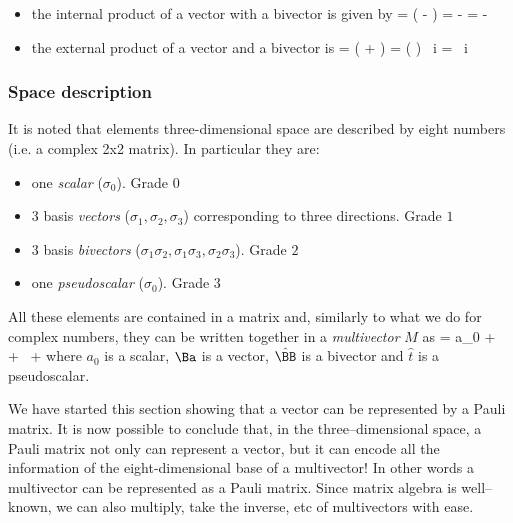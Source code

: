 \begin{itemize}
\Ba \, \hat{\BB} = \Ba \cdot \hat{\BB} + \Ba \wedge \hat{\BB}
\ee
\item the internal product of a vector with a bivector is given by
\be 
\Ba \cdot \hat{\BB}  =  \left(\Ba \hat{\BB} - \hat{\BB} \Ba \right) = - \Ba \times \Bb \times \Bc = - \Ba \times \BB
\ee
\item the external product of a vector and a bivector is
%
\be 
\Ba \wedge \hat{\BB}  =  \left(\Ba \hat{\BB} + \hat{\BB} \Ba \right) =  \Ba \cdot \left( \Bb \times \Bc\right) \,  i  =  \Ba \cdot  \BB  \,  i 
\ee
%
%
\end{itemize}


\subsubsection{Space description}
It is noted that elements  three-dimensional space are described by eight numbers (i.e. a complex 2x2 matrix). In particular they are: 
\begin{itemize}
\item one \emph{scalar} ($\sigma_0$). Grade $0$
\item 3 basis \emph{vectors} ($\sigma_1, \sigma_2, \sigma_3$) corresponding to three directions. Grade $1$
\item 3 basis \emph{bivectors} ($\sigma_1 \sigma_2, \sigma_1 \sigma_3, \sigma_2 \sigma_3$). Grade $2$
\item one \emph{pseudoscalar} ($\sigma_0$). Grade $3$
\end{itemize}
%
All these elements are contained in a matrix and, similarly to what we do for complex numbers, they can be written together in a 
\emph{multivector} 
$\mathit{M}$  
as
\be \label{Mmultivector}
 = 
a_0 + \, \Ba + \, \hat{\BB} +  
\ee
where $a_0$ is a scalar, $\Ba$ is a vector, $\hat{\BB}$ is a bivector and $\hat{\mathit{t}}$ is a pseudoscalar.

We have started this section showing that a vector can be represented by a Pauli matrix. It is now possible to conclude that, in the three--dimensional space, a Pauli matrix not only can represent a vector, but it can encode all the information of the eight-dimensional base of a multivector! In other words a multivector can be represented as a Pauli matrix. Since matrix algebra is well--known, we can also multiply, take the inverse, etc of multivectors with ease.

